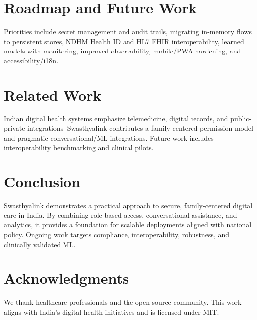 \documentclass[conference]{IEEEtran}
\begin{document}
\section{Roadmap and Future Work}
Priorities include secret management and audit trails, migrating in-memory flows to persistent stores, NDHM Health ID and HL7 FHIR interoperability, learned models with monitoring, improved observability, mobile/PWA hardening, and accessibility/i18n.

\section{Related Work}
Indian digital health systems emphasize telemedicine, digital records, and public-private integrations. Swasthyalink contributes a family-centered permission model and pragmatic conversational/ML integrations. Future work includes interoperability benchmarking and clinical pilots.

\section{Conclusion}
Swasthyalink demonstrates a practical approach to secure, family-centered digital care in India. By combining role-based access, conversational assistance, and analytics, it provides a foundation for scalable deployments aligned with national policy. Ongoing work targets compliance, interoperability, robustness, and clinically validated ML.

\section*{Acknowledgments}
We thank healthcare professionals and the open-source community. This work aligns with India’s digital health initiatives and is licensed under MIT.



\end{document}

